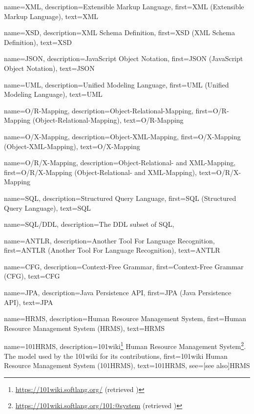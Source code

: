 {
    name=XML,
    description={Extensible Markup Language},
    first={XML (Extensible Markup Language)},
    text={XML}
}

{
    name=XSD,
    description={XML Schema Definition},
    first={XSD (XML Schema Definition)},
    text={XSD}
}

{
    name=JSON,
    description={JavaScript Object Notation},
    first={JSON (JavaScript Object Notation)},
    text={JSON}
}

{
    name=UML,
    description={Unified Modeling Language},
    first={UML (Unified Modeling Language)},
    text={UML}
}

{
    name=O/R-Mapping,
    description={Object-Relational-Mapping},
    first={O/R-Mapping (Object-Relational-Mapping)},
    text={O/R-Mapping}
}

{
    name=O/X-Mapping,
    description={Object-XML-Mapping},
    first={O/X-Mapping (Object-XML-Mapping)},
    text={O/X-Mapping}
}

{
    name=O/R/X-Mapping,
    description={Object-Relational- and XML-Mapping},
    first={O/R/X-Mapping (Object-Relational- and XML-Mapping)},
    text={O/R/X-Mapping}
}

{
    name=SQL,
    description={Structured Query Language},
    first={SQL (Structured Query Language)},
    text={SQL}
}

{
    name=SQL/DDL,
    description={The DDL subset of SQL},
}

{
    name=ANTLR,
    description={Another Tool For Language Recognition},
    first={ANTLR (Another Tool For Language Recognition)},
    text={ANTLR}
}

{
    name=CFG,
    description={Context-Free Grammar},
    first={Context-Free Grammar (CFG)},
    text={CFG}
}

{
    name=JPA,
    description={Java Persistence API},
    first={JPA (Java Persistence API)},
    text={JPA}
}

{
    name=HRMS,
    description={Human Resource Management System},
    first={Human Resource Management System (HRMS)},
    text={HRMS}
}

{
    name=101HRMS,
    description={101wiki\footnote{\url{https://101wiki.softlang.org/} (retrieved )} Human Resource Management System\footnote{\url{https://101wiki.softlang.org/101:@system} (retrieved )}. The model used by the 101wiki for its contributions},
    first={101wiki Human Resource Management System (101HRMS)},
    text={101HRMS},
    see=[see also]{HRMS}
}

